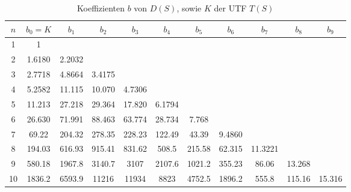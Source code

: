 \begin{table}[!htb] %
\begin{center}
{\footnotesize
\begin{tabular}{|c||c|c|c|c|c|c|c|c|c|c|}\hline
$n$ & $b_0=K$ & $b_1$ & $b_2$ & $b_3$ & $b_4$ & $b_5$ & $b_6$ & $b_7$ & $b_8$ & $b_9$ \\ \hline\hline
1 & 1 & & & & & & & & &\\ \hline
2 & 1.6180 & 2.2032 & & & & & & & &\\ \hline
3 & 2.7718 & 4.8664 & 3.4175 & & & & & & &\\ \hline
4 & 5.2582 & 11.115 & 10.070 & 4.7306 & & & & & &\\ \hline
5 & 11.213 & 27.218 & 29.364 & 17.820 & 6.1794  & & & & & \\ \hline
6 & 26.630 & 71.991 & 88.463 & 63.774 & 28.734 & 7.768 & & & &   \\ \hline   
7 & 69.22 & 204.32 & 278.35 & 228.23 & 122.49 & 43.39 & 9.4860 & & &  \\ \hline   
8 & 194.03 & 616.93 & 915.41 & 831.62 & 508.5 & 215.58 & 62.315 & 11.3221  & & \\ \hline
9 & 580.18 & 1967.8 & 3140.7 & 3107 & 2107.6 & 1021.2 & 355.23 & 86.06 & 13.268 &  \\ \hline
10 & 1836.2 & 6593.9 & 11216 & 11934 & 8823 & 4752.5 & 1896.2 & 555.8 & 115.16 & 15.316  \\ \hline
\end{tabular}\vspace*{-1mm}\caption{Koeffizienten $b$ von $D(S)$, sowie $K$ der UTF $T(S)$} \label{koef-b}}
\end{center}
\vspace*{-6mm}
\end{table}
